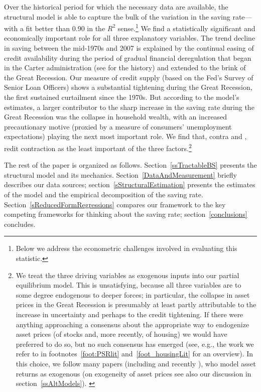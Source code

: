 \documentclass[titlepage]{\econtex}
\begin{document}
Over the historical period for which the necessary data are available, the structural model is able to capture the bulk of the variation in the saving rate---with a fit better than 0.90 in the $R^2$ sense.\footnote{Below we address the econometric challenges involved in evaluating this statistic.} We find a statistically significant and economically important role for all three explanatory variables. The trend decline in saving between the mid-1970s and 2007 is explained by the continual easing of credit availability during the period of gradual financial deregulation that began in the Carter administration (see \cite{wooleyDeregulation} for the history) and extended to the brink of the Great Recession. Our measure of credit supply (based on the Fed's Survey of Senior Loan Officers) shows a substantial tightening during the Great Recession, the first sustained curtailment since the 1970s.  But according to the model's estimates, a larger contributor to the sharp increase in the saving rate during the Great Recession was the collapse in household wealth, with an increased precautionary motive (proxied by a measure of consumers' unemployment expectations) playing the next most important role.  We find that, contra \cite{gkLiq} and \cite{glLiq}, redit contraction as the least important of the three factors.\footnote{We treat the three driving variables as exogenous inputs into our partial equilibrium model.  This is unsatisfying, because all three variables are to some degree endogenous to deeper forces; in particular, the collapse in asset prices in the Great Recession is presumably at least partly attributable to the increase in uncertainty and perhaps to the credit tightening.  If there were anything approaching a consensus about the appropriate way to endogenize asset prices (of stocks and, more recently, of housing) we would have preferred to do so, but no such consensus has emerged (see, e.g., the work we refer to in footnotes~\ref{foot:PSRlit} and~\ref{foot_housingLit} for an overview). In this choice, we follow many papers (including \cite{landvoigt:rfs} and recently \cite{krusell:usWealthDistr}), who model asset returns as exogenous (on exogeneity of asset prices see also our discussion in section~\ref{ssAltModels}).
\hypertarget{Exogeneity}{}
}

The rest of the paper is organized as follows. Section~\ref{ssTractableBS} presents the structural model and its mechanics. Section~\ref{DataAndMeasurement} briefly describes our data sources; section~\ref{sStructuralEstimation} presents the estimates of the model and the empirical decomposition of the saving rate. Section~\ref{sReducedFormRegressions} compares our framework to the key competing frameworks for thinking about the saving rate; section~\ref{conclusions} concludes.
\end{document}
